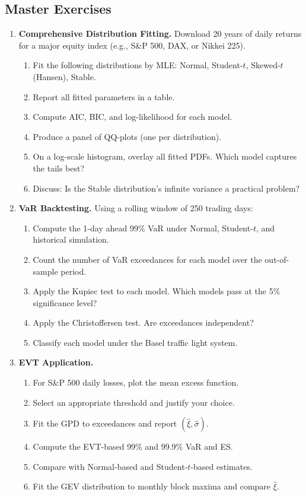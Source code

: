 \documentclass[11pt, a4paper]{article}
\theoremstyle{definition}
\begin{document}
\subsection{Master Exercises}

\begin{enumerate}[label=\textbf{M\arabic*.}]

\item \textbf{Comprehensive Distribution Fitting.}
Download 20 years of daily returns for a major equity index (e.g., S\&P 500, DAX, or Nikkei 225).
\begin{enumerate}[label=(\alph*)]
  \item Fit the following distributions by MLE: Normal, Student-$t$, Skewed-$t$ (Hansen), Stable.
  \item Report all fitted parameters in a table.
  \item Compute AIC, BIC, and log-likelihood for each model.
  \item Produce a panel of QQ-plots (one per distribution).
  \item On a log-scale histogram, overlay all fitted PDFs. Which model captures the tails best?
  \item Discuss: Is the Stable distribution's infinite variance a practical problem?
\end{enumerate}

\item \textbf{VaR Backtesting.}
Using a rolling window of 250 trading days:
\begin{enumerate}[label=(\alph*)]
  \item Compute the 1-day ahead 99\% VaR under Normal, Student-$t$, and historical simulation.
  \item Count the number of VaR exceedances for each model over the out-of-sample period.
  \item Apply the Kupiec test to each model. Which models pass at the 5\% significance level?
  \item Apply the Christoffersen test. Are exceedances independent?
  \item Classify each model under the Basel traffic light system.
\end{enumerate}

\item \textbf{EVT Application.}
\begin{enumerate}[label=(\alph*)]
  \item For S\&P 500 daily losses, plot the mean excess function.
  \item Select an appropriate threshold and justify your choice.
  \item Fit the GPD to exceedances and report $(\hat{\xi}, \hat{\sigma})$.
  \item Compute the EVT-based 99\% and 99.9\% VaR and ES.
  \item Compare with Normal-based and Student-$t$-based estimates.
  \item Fit the GEV distribution to monthly block maxima and compare $\hat{\xi}$.
\end{enumerate}


\end{enumerate}
\end{document}
